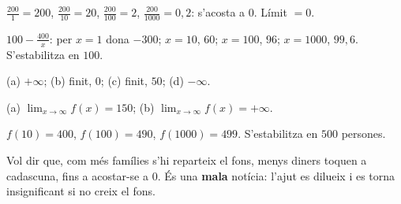 \begin{solucions}
\begin{sollist}
  \item $\frac{200}{1}=200$, $\frac{200}{10}=20$, $\frac{200}{100}=2$,
        $\frac{200}{1000}=0,2$: s'acosta a $0$. Límit $=0$.
  \item $100-\frac{400}{x}$: per $x=1$ dona $-300$; $x=10$, $60$; $x=100$, $96$;
        $x=1000$, $99,6$. S'estabilitza en $100$.
  \item (a) $+\infty$; \quad (b) finit, $0$; \quad (c) finit, $50$; \quad (d) $-\infty$.
  \item (a) $\displaystyle\lim_{x\to\infty}f(x)=150$; \quad
        (b) $\displaystyle\lim_{x\to\infty}f(x)=+\infty$.
  \item $f(10)=400$, $f(100)=490$, $f(1000)=499$. S'estabilitza en $500$ persones.
  \item Vol dir que, com més famílies s'hi reparteix el fons, menys diners toquen a
        cadascuna, fins a acostar-se a $0$. És una \textbf{mala} notícia: l'ajut es
        dilueix i es torna insignificant si no creix el fons.
\end{sollist}
\end{solucions}
